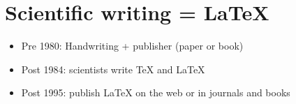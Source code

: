 \documentclass[%
twoside,                 %
draft,                   %
final,                   %
chapterprefix=true,      %
open=right               %
10pt]{book}
\begin{document}
\section*{Scientific writing = {\LaTeX}}

\begin{itemize}
 \item Pre 1980: Handwriting + publisher (paper or book)

 \item Post 1984: scientists write TeX and {\LaTeX}

 \item Post 1995: publish {\LaTeX} on the web or in journals and books
\end{itemize}

\noindent
\blatexcod
\providecommand{\shadedskip}{}
\renewenvironment{shadedskip}{
\def\FrameCommand{\colorbox{shadecolor}}\FrameRule0.6pt
\MakeFramed {\FrameRestore}\vskip3mm}{\vskip0mm\endMakeFramed}
\providecommand{\shadedquoteBlue}{}
\end{document}
